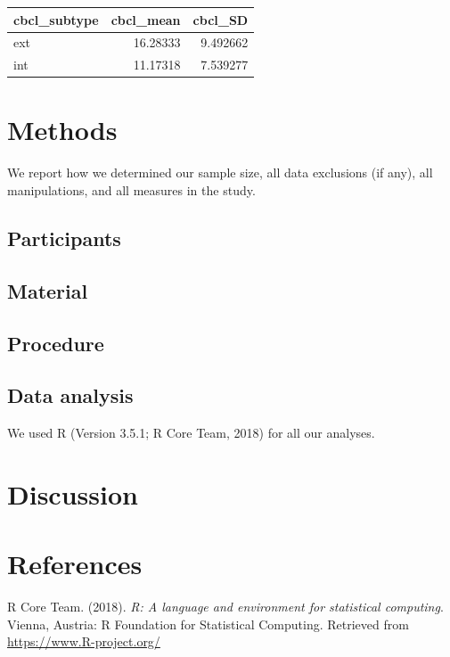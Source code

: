 \documentclass[man]{apa6}
\begin{document}
\begin{tabular}{lrr}
\toprule
cbcl\_subtype & cbcl\_mean & cbcl\_SD\\
\midrule
ext & 16.28333 & 9.492662\\
int & 11.17318 & 7.539277\\
\bottomrule
\end{tabular}

\section{Methods}\label{methods}

We report how we determined our sample size, all data exclusions (if
any), all manipulations, and all measures in the study.

\subsection{Participants}\label{participants}

\subsection{Material}\label{material}

\subsection{Procedure}\label{procedure}

\subsection{Data analysis}\label{data-analysis}

We used R (Version 3.5.1; R Core Team, 2018) for all our analyses.

\section{Discussion}\label{discussion}

\newpage

\section{References}\label{references}

\begingroup
\setlength{\parindent}{-0.5in} \setlength{\leftskip}{0.5in}

\hypertarget{refs}{}
\hypertarget{ref-R-base}{}
R Core Team. (2018). \emph{R: A language and environment for statistical
computing}. Vienna, Austria: R Foundation for Statistical Computing.
Retrieved from \url{https://www.R-project.org/}

\endgroup
\end{document}
